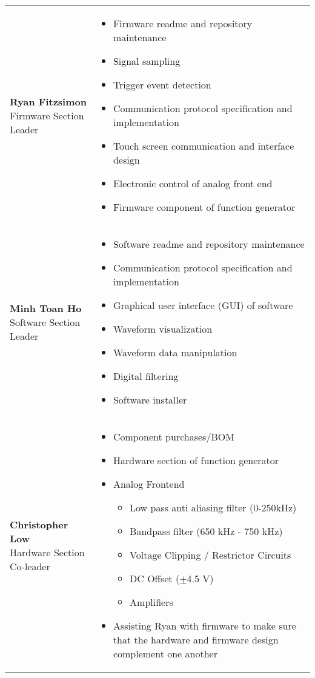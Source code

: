 \documentclass[12pt]{report}
\begin{document}
\vspace{0.4cm}
\begin{tabular}{l p{}}
	
	\pbox{20cm}{\textbf{Ryan Fitzsimon} \\ Firmware Section Leader} &
	{\begin{itemize}
		\item Firmware readme and repository maintenance
		\item Signal sampling
		\item Trigger event detection
		\item Communication protocol specification and implementation
		\item Touch screen communication and interface design
		\item Electronic control of analog front end
		\item Firmware component of function generator
	\end{itemize}}\\
	
	\pbox{20cm}{\textbf{Minh Toan Ho} \\ Software Section Leader} &
	{\begin{itemize}
		\item Software readme and repository maintenance
		\item Communication protocol specification and implementation
		\item Graphical user interface (GUI) of software
		\item Waveform visualization
		\item Waveform data manipulation
		\item Digital filtering
		\item Software installer
	\end{itemize}}\\
	
	\pbox{20cm}{\textbf{Christopher Low} \\ Hardware Section Co-leader} &
	{\begin{itemize}
		\item Component purchases/BOM
		\item Hardware section of function generator
		\item Analog Frontend
		\begin{itemize}
			\item Low pass anti aliasing filter (0-250kHz)
			\item Bandpass filter (650 kHz - 750 kHz)
			\item Voltage Clipping / Restrictor Circuits
			\item DC Offset ($\pm$4.5 V)
			\item Amplifiers
		\end{itemize}
		\item Assisting Ryan with firmware to make sure that the hardware and firmware design complement one another
	\end{itemize}}\\


\end{tabular}
\end{document}

